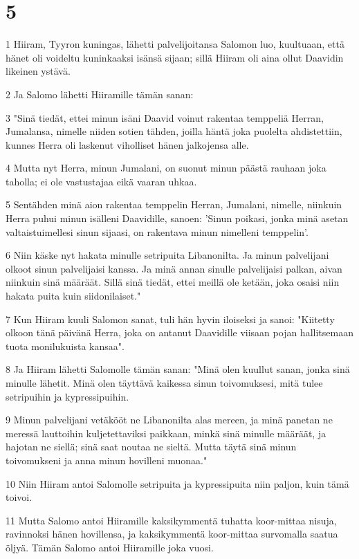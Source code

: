 \chapter{5}

\par 1 Hiiram, Tyyron kuningas, lähetti palvelijoitansa Salomon luo, kuultuaan, että hänet oli voideltu kuninkaaksi isänsä sijaan; sillä Hiiram oli aina ollut Daavidin likeinen ystävä.
\par 2 Ja Salomo lähetti Hiiramille tämän sanan:
\par 3 "Sinä tiedät, ettei minun isäni Daavid voinut rakentaa temppeliä Herran, Jumalansa, nimelle niiden sotien tähden, joilla häntä joka puolelta ahdistettiin, kunnes Herra oli laskenut viholliset hänen jalkojensa alle.
\par 4 Mutta nyt Herra, minun Jumalani, on suonut minun päästä rauhaan joka taholla; ei ole vastustajaa eikä vaaran uhkaa.
\par 5 Sentähden minä aion rakentaa temppelin Herran, Jumalani, nimelle, niinkuin Herra puhui minun isälleni Daavidille, sanoen: 'Sinun poikasi, jonka minä asetan valtaistuimellesi sinun sijaasi, on rakentava minun nimelleni temppelin'.
\par 6 Niin käske nyt hakata minulle setripuita Libanonilta. Ja minun palvelijani olkoot sinun palvelijaisi kanssa. Ja minä annan sinulle palvelijaisi palkan, aivan niinkuin sinä määräät. Sillä sinä tiedät, ettei meillä ole ketään, joka osaisi niin hakata puita kuin siidonilaiset."
\par 7 Kun Hiiram kuuli Salomon sanat, tuli hän hyvin iloiseksi ja sanoi: "Kiitetty olkoon tänä päivänä Herra, joka on antanut Daavidille viisaan pojan hallitsemaan tuota monilukuista kansaa".
\par 8 Ja Hiiram lähetti Salomolle tämän sanan: "Minä olen kuullut sanan, jonka sinä minulle lähetit. Minä olen täyttävä kaikessa sinun toivomuksesi, mitä tulee setripuihin ja kypressipuihin.
\par 9 Minun palvelijani vetäkööt ne Libanonilta alas mereen, ja minä panetan ne meressä lauttoihin kuljetettaviksi paikkaan, minkä sinä minulle määräät, ja hajotan ne siellä; sinä saat noutaa ne sieltä. Mutta täytä sinä minun toivomukseni ja anna minun hovilleni muonaa."
\par 10 Niin Hiiram antoi Salomolle setripuita ja kypressipuita niin paljon, kuin tämä toivoi.
\par 11 Mutta Salomo antoi Hiiramille kaksikymmentä tuhatta koor-mittaa nisuja, ravinnoksi hänen hovillensa, ja kaksikymmentä koor-mittaa survomalla saatua öljyä. Tämän Salomo antoi Hiiramille joka vuosi.

